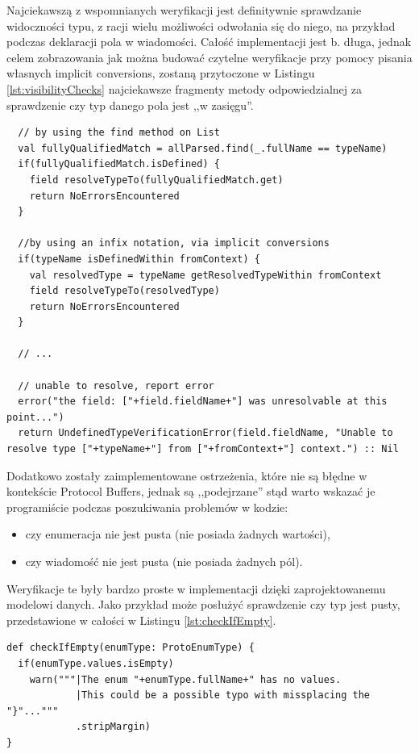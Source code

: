 \documentclass[pdflatex,11pt]{aghdpl}
\begin{document}
Najciekawszą z wspomnianych weryfikacji jest definitywnie sprawdzanie widoczności typu, z racji wielu możliwości odwołania się do niego,
na przykład podczas deklaracji pola w wiadomości. Całość implementacji jest b. długa, jednak celem zobrazowania jak można budować czytelne weryfikacje
przy pomocy pisania własnych implicit conversions, zostaną przytoczone w Listingu \ref{lst:visibilityChecks} najciekawsze fragmenty metody odpowiedzialnej
za sprawdzenie czy typ danego pola jest ,,w zasięgu''.

\begin{lstlisting}
  // by using the find method on List
  val fullyQualifiedMatch = allParsed.find(_.fullName == typeName)
  if(fullyQualifiedMatch.isDefined) {
    field resolveTypeTo(fullyQualifiedMatch.get)      
    return NoErrorsEncountered
  } 
    
  //by using an infix notation, via implicit conversions
  if(typeName isDefinedWithin fromContext) {
    val resolvedType = typeName getResolvedTypeWithin fromContext
    field resolveTypeTo(resolvedType)      
    return NoErrorsEncountered
  }
    
  // ... 

  // unable to resolve, report error
  error("the field: ["+field.fieldName+"] was unresolvable at this point...")
  return UndefinedTypeVerificationError(field.fieldName, "Unable to resolve type ["+typeName+"] from ["+fromContext+"] context.") :: Nil
\end{lstlisting}


Dodatkowo zostały zaimplementowane ostrzeżenia, które nie są błędne w kontekście Protocol Buffers,
jednak są ,,podejrzane'' stąd warto wskazać je programiście podczas poszukiwania problemów w kodzie:

\begin{itemize}
 \item czy enumeracja nie jest pusta (nie posiada żadnych wartości),
 \item czy wiadomość nie jest pusta (nie posiada żadnych pól).
\end{itemize}

Weryfikacje te były bardzo proste w implementacji dzięki zaprojektowanemu modelowi danych. Jako przykład może posłużyć sprawdzenie czy typ jest pusty, 
przedstawione w całości w Listingu \ref{lst:checkIfEmpty}.

\begin{lstlisting}
def checkIfEmpty(enumType: ProtoEnumType) {
  if(enumType.values.isEmpty)
    warn("""|The enum "+enumType.fullName+" has no values.
            |This could be a possible typo with missplacing the "}"..."""
            .stripMargin)
}
\end{lstlisting}
\end{document}
